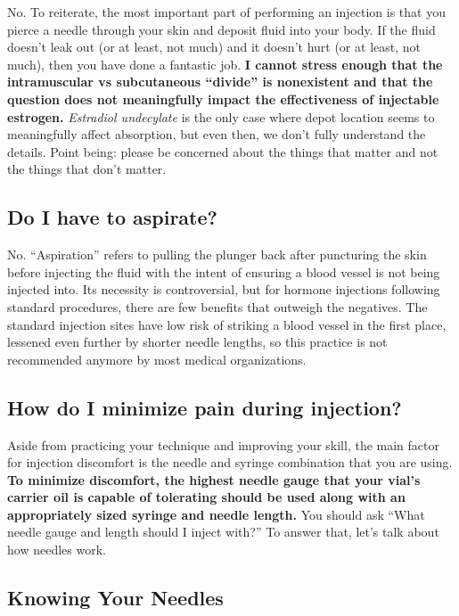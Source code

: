 \documentclass{article}
\begin{document}
No. To reiterate, the most important part of performing an injection is that you pierce a needle through your skin and deposit fluid into your body. If the fluid doesn’t leak out (or at least, not much) and it doesn’t hurt (or at least, not much), then you have done a fantastic job. \textbf{I cannot stress enough that the intramuscular vs subcutaneous “divide” is nonexistent and that the question does not meaningfully impact the effectiveness of injectable estrogen.} \textit{Estradiol undecylate} is the only case where depot location seems to meaningfully affect absorption, but even then, we don’t fully understand the details. Point being: please be concerned about the things that matter and not the things that don’t matter.

\subsection{Do I have to aspirate?}

No. “Aspiration” refers to pulling the plunger back after puncturing the skin before injecting the fluid with the intent of ensuring a blood vessel is not being injected into. Its necessity is controversial, but for hormone injections following standard procedures, there are few benefits that outweigh the negatives. The standard injection sites have low risk of striking a blood vessel in the first place, lessened even further by shorter needle lengths, so this practice is not recommended anymore by most medical organizations.

\subsection{How do I minimize pain during injection?}

Aside from practicing your technique and improving your skill, the main factor for injection discomfort is the needle and syringe combination that you are using. \textbf{To minimize discomfort, the highest needle gauge that your vial’s carrier oil is capable of tolerating should be used along with an appropriately sized syringe and needle length.} You should ask “What needle gauge and length should I inject with?” To answer that, let’s talk about how needles work.

\subsection*{Knowing Your Needles}
\end{document}
